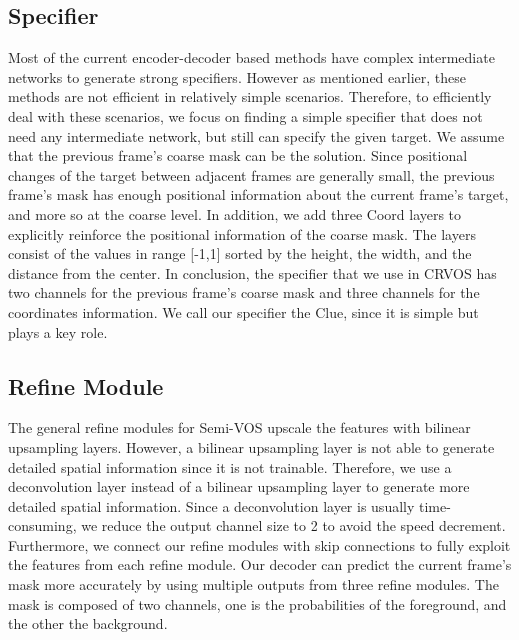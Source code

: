 \documentclass{article}
\begin{document}
\subsection{Specifier}
Most of the current encoder-decoder based methods have complex intermediate networks to generate strong specifiers. However as mentioned earlier, these methods are not efficient in relatively simple scenarios. Therefore, to efficiently deal with these scenarios, we focus on finding a simple specifier that does not need any intermediate network, but still can specify the given target. We assume that the previous frame's coarse mask can be the solution. Since positional changes of the target between adjacent frames are generally small, the previous frame's mask has enough positional information about the current frame's target, and more so at the coarse level. In addition, we add three Coord \cite{liu2018intriguing} layers to explicitly reinforce the positional information of the coarse mask. The layers consist of the values in range [-1,1] sorted by the height, the width, and the distance from the center. In conclusion, the specifier that we use in CRVOS has two channels for the previous frame's coarse mask and three channels for the coordinates information. We call our specifier the Clue, since it is simple but plays a key role.



\subsection{Refine Module} \label{refine module}
The general refine modules for Semi-VOS upscale the features with bilinear upsampling layers. However, a bilinear upsampling layer is not able to generate detailed spatial information since it is not trainable. Therefore, we use a deconvolution layer instead of a bilinear upsampling layer to generate more detailed spatial information. Since a deconvolution layer is usually time-consuming, we reduce the output channel size to 2 to avoid the speed decrement. Furthermore, we connect our refine modules with skip connections to fully exploit the features from each refine module. Our decoder can predict the current frame's mask more accurately by using multiple outputs from three refine modules. The mask is composed of two channels, one is the probabilities of the foreground, and the other the background. 
\end{document}
